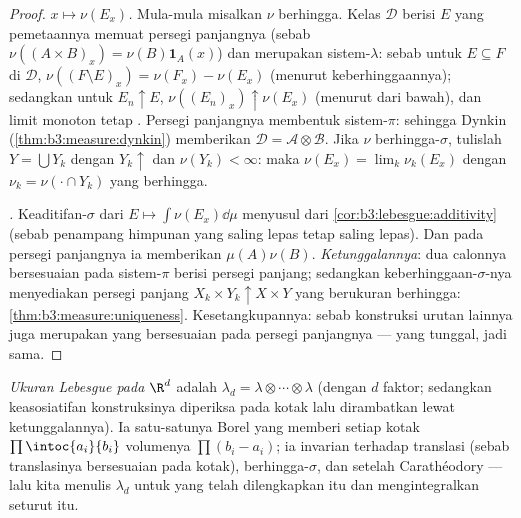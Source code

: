 \begin{proof}
\emph{ $x \mapsto \nu(E_x)$.} Mula-mula misalkan $\nu$
berhingga. Kelas $\mathcal D$ berisi $E$ yang pemetaannya 
memuat persegi panjangnya (sebab $\nu((A\times B)_x) =
\nu(B)\mathbf 1_A(x)$) dan merupakan sistem-$\lambda$: sebab untuk $E
\subseteq F$ di $\mathcal D$, $\nu((F\setminus E)_x) =
\nu(F_x) - \nu(E_x)$ (menurut keberhinggaannya); sedangkan untuk $E_n \uparrow E$,
$\nu((E_n)_x) \uparrow \nu(E_x)$ (menurut  dari bawah), dan
limit monoton  tetap .
Persegi panjangnya membentuk sistem-$\pi$: sehingga Dynkin
(\cref{thm:b3:measure:dynkin}) memberikan $\mathcal D = \mathcal
A\otimes\mathcal B$. Jika $\nu$ berhingga-$\sigma$, tulislah $Y =
\bigcup Y_k$ dengan $Y_k \uparrow$ dan $\nu(Y_k) < \infty$: maka $\nu(E_x) =
\lim_k\nu_k(E_x)$ dengan $\nu_k = \nu(\cdot\cap Y_k)$ yang berhingga.

\emph{.} Keaditifan-$\sigma$ dari $E \mapsto
\int\nu(E_x)\dd\mu$ menyusul dari
\cref{cor:b3:lebesgue:additivity} (sebab penampang himpunan yang saling lepas
tetap saling lepas). Dan pada persegi panjangnya ia memberikan $\mu(A)\nu(B)$.
\emph{Ketunggalannya}: dua calonnya bersesuaian pada sistem-$\pi$ berisi
persegi panjang; sedangkan keberhinggaan-$\sigma$-nya menyediakan persegi panjang $X_k\times
Y_k \uparrow X\times Y$ yang berukuran berhingga:
\cref{thm:b3:measure:uniqueness}. Kesetangkupannya: sebab
konstruksi urutan lainnya juga merupakan  yang bersesuaian pada
persegi panjangnya --- yang tunggal, jadi sama.
\end{proof}

\begin{definition}\label{def:b3:product:lebesgue}
\emph{Ukuran Lebesgue pada $\R^d$} adalah $\lambda_d = \lambda\otimes\cdots\otimes\lambda$
(dengan $d$ faktor; sedangkan keasosiatifan konstruksinya diperiksa pada
kotak lalu dirambatkan lewat ketunggalannya). Ia satu-satunya 
Borel yang memberi setiap kotak $\prod\intoc{a_i}{b_i}$ volumenya
$\prod(b_i - a_i)$; ia invarian terhadap translasi (sebab translasinya
bersesuaian pada kotak), berhingga-$\sigma$, dan  setelah
 Carathéodory --- lalu kita menulis $\lambda_d$ untuk
 yang telah dilengkapkan itu dan mengintegralkan seturut itu.
\end{definition}

